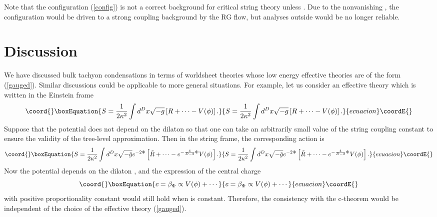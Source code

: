 \documentclass[a4paper,a4paper]{article}
\begin{document}
Note that the configuration (\ref{config}) is not a correct background for critical string theory unless 
\coordHE{}. 
Due to the nonvanishing \myHighlight{$\beta_\Phi$}\coordHE{}, the configuration would be driven to a strong coupling background by the RG 
flow, but analyses outside \coordHE{} would be no longer reliable. 























\vspace{1cm}

\section{Discussion}   \label{discussion}

\vspace{5mm}

We have discussed bulk tachyon condensations in terms of worldsheet theories whose low energy effective theories 
are of the form (\ref{gauged}). 
Similar discussions could be applicable to more general situations. 
For example, let us consider an effective theory which is written in the Einstein frame 
\begin{equation}\coord{}\boxEquation{
S = \frac1{2\kappa^2}\int d^Dx\sqrt{-g}\left[R+\cdots-V(\phi)\right].
}{
S = \frac1{2\kappa^2}\int d^Dx\sqrt{-g}\left[R+\cdots-V(\phi)\right].
}{ecuacion}\coordE{}\end{equation}
Suppose that the potential \coordHE{} does not depend on the dilaton \myHighlight{$\Phi$}\coordHE{} so that one can take an arbitrarily 
small value of the string coupling constant to ensure the validity of the tree-level approximation. 
Then in the string frame, the corresponding action is
\begin{equation}\coord{}\boxEquation{
S = \frac1{2\kappa^2}\int d^Dx\sqrt{-\tilde{g}}e^{-2\Phi}\left[\tilde{R}+\cdots-e^{-\frac4{D-2}\Phi}V(\phi)\right]. 
}{
S = \frac1{2\kappa^2}\int d^Dx\sqrt{-\tilde{g}}e^{-2\Phi}\left[\tilde{R}+\cdots-e^{-\frac4{D-2}\Phi}V(\phi)\right]. 
}{ecuacion}\coordE{}\end{equation}
Now the potential depends on the dilaton \myHighlight{$\Phi$}\coordHE{}, and the expression of the central charge 
\begin{equation}\coord{}\boxEquation{
c=\beta_\Phi \propto V(\phi)+\cdots
}{
c=\beta_\Phi \propto V(\phi)+\cdots
}{ecuacion}\coordE{}\end{equation}
with positive proportionality constant would still hold when \myHighlight{$\Phi$}\coordHE{} is constant. 
Therefore, the consistency with the c-theorem would be independent of the choice of the effective theory 
(\ref{gauged}). 
\end{document}
